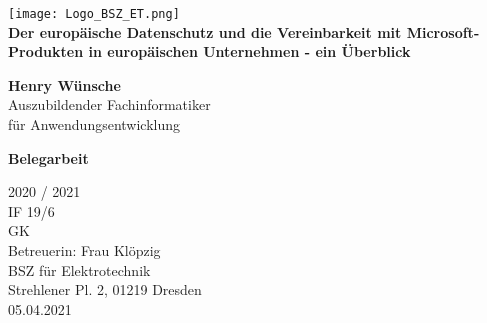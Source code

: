 \begin{titlepage}
    \begin{center}
        \texttt{[image: Logo\_BSZ\_ET.png]}\\
        \vspace*{1cm}
        {\huge\textbf{Der europäische Datenschutz und die Vereinbarkeit mit Microsoft-Produkten in europäischen Unternehmen - ein Überblick}}

        \vspace{2cm}

            {\huge\textbf{Henry Wünsche}} \\
            Auszubildender Fachinformatiker \\ für Anwendungsentwicklung

        \vfill
        {\huge\textbf{Belegarbeit}}

        \vspace{1cm}
        {\Huge 2020 / 2021}\\
        \vspace{0.8cm}
        IF 19/6\\
        GK\\
        Betreuerin: Frau Klöpzig\\
        BSZ für Elektrotechnik\\
        Strehlener Pl. 2, 01219 Dresden\\
        05.04.2021
    \end{center}
\end{titlepage}
\pagebreak
